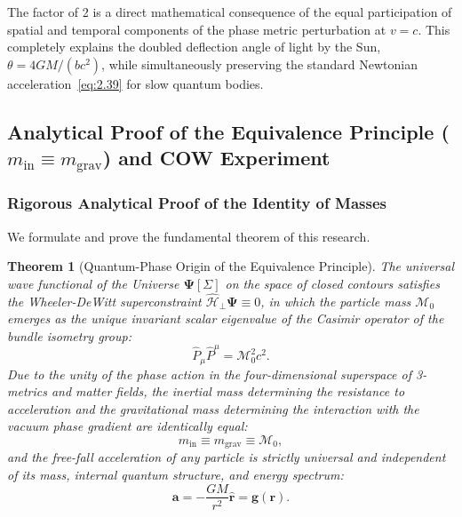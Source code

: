 \documentclass[11pt,a4paper]{article}
\newtheorem{theorem}{Theorem}[section]
\theoremstyle{definition}
\begin{document}
The factor of 2 is a direct mathematical consequence of the equal participation of spatial and temporal components of the phase metric perturbation at $v = c$. This completely explains the doubled deflection angle of light by the Sun, $\theta = 4GM/(bc^2)$, while simultaneously preserving the standard Newtonian acceleration~\eqref{eq:2.39} for slow quantum bodies.

\subsection{Analytical Proof of the Equivalence Principle ($m_{\text{in}} \equiv m_{\text{grav}}$) and COW Experiment}\label{sec:2.5}

\subsubsection{Rigorous Analytical Proof of the Identity of Masses}\label{sec:2.5.1}

We formulate and prove the fundamental theorem of this research.

\begin{theorem}[Quantum-Phase Origin of the Equivalence Principle]\label{thm:wep}
The universal wave functional of the Universe $\mathbf{\Psi}[\Sigma]$ on the space of closed contours satisfies the Wheeler-DeWitt superconstraint $\hat{\mathcal{H}}_\perp \mathbf{\Psi} \equiv 0$, in which the particle mass $\mathcal{M}_0$ emerges as the unique invariant scalar eigenvalue of the Casimir operator of the bundle isometry group:
\begin{equation*}
\hat{P}_\mu \hat{P}^\mu = \mathcal{M}_0^2 c^2.
\end{equation*}
Due to the unity of the phase action in the four-dimensional superspace of 3-metrics and matter fields, the inertial mass determining the resistance to acceleration and the gravitational mass determining the interaction with the vacuum phase gradient are identically equal:
\begin{equation}\label{eq:2.42}\tag{2.42}
m_{\text{in}} \equiv m_{\text{grav}} \equiv \mathcal{M}_0,
\end{equation}
and the free-fall acceleration of any particle is strictly universal and independent of its mass, internal quantum structure, and energy spectrum:
\begin{equation}\label{eq:2.43}\tag{2.43}
\mathbf{a} = -\frac{GM}{r^2} \hat{\mathbf{r}} = \mathbf{g}(\mathbf{r}).
\end{equation}
\end{theorem}
\end{document}
